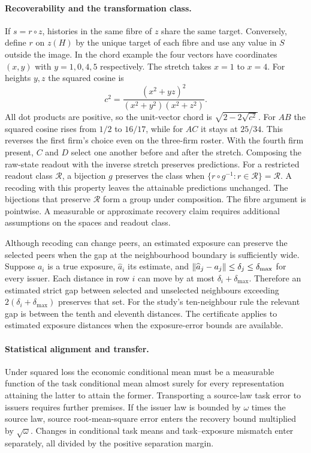 \paragraph{Recoverability and the transformation class.}
If $s=r\circ z$, histories in the same fibre of $z$ share the same
target. Conversely, define $r$ on $z(H)$ by the unique target of each
fibre and use any value in $S$ outside the image. In the chord example
the four vectors have coordinates $(x,y)$ with $y=1,0,4,5$ respectively.
The stretch takes $x=1$ to $x=4$. For heights $y,z$ the squared cosine is
\[
  c^2=\frac{(x^2+yz)^2}{(x^2+y^2)(x^2+z^2)}.
\]
All dot products are positive, so the unit-vector chord is
$\sqrt{2-2\sqrt{c^2}}$. For $AB$ the squared cosine rises from $1/2$
to $16/17$, while for $AC$ it stays at $25/34$. This reverses the
first firm's choice even on the three-firm roster. With the fourth
firm present, $C$ and $D$ select one another before and after the stretch.
Composing the raw-state readout with the inverse stretch preserves
predictions. For a
restricted readout class $\mathcal R$, a bijection $g$ preserves
the class when $\{r\circ g^{-1}:r\in\mathcal R\}=\mathcal R$. A
recoding with this property leaves the attainable predictions unchanged.
The bijections that preserve $\mathcal R$ form a group under
composition. The fibre
argument is pointwise. A measurable or approximate recovery claim
requires additional assumptions on the spaces and readout class.

Although recoding can change peers, an estimated exposure can
preserve the selected peers when the gap at the neighbourhood
boundary is sufficiently wide. Suppose $a_i$ is a true exposure,
$\widehat a_i$ its estimate, and
$\lVert \widehat a_j-a_j\rVert\leq\delta_j\leq\delta_{\max}$ for every
issuer. Each distance in row $i$ can move by at most
$\delta_i+\delta_{\max}$. Therefore an estimated strict gap between
selected and unselected neighbours exceeding
$2(\delta_i+\delta_{\max})$ preserves that set. For the study's
ten-neighbour rule the relevant gap is between the tenth
and eleventh distances. The certificate applies to estimated exposure
distances when the exposure-error bounds are available.

\paragraph{Statistical alignment and transfer.}
Under squared loss the economic conditional mean must be a measurable
function of the task conditional mean almost surely for every representation
attaining the latter to attain the former.
Transporting a source-law task error to issuers requires further premises.
If the issuer law is bounded by $\omega$ times the source law, source
root-mean-square error enters the recovery bound multiplied by
$\sqrt{\omega}$. Changes in conditional task means and task--exposure
mismatch enter separately, all divided by the positive separation margin.

